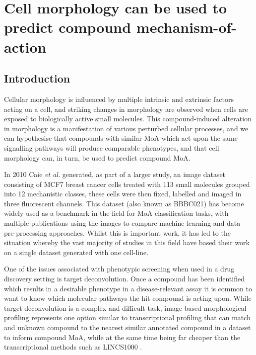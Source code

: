 \documentclass[a4paper,11pt,twoside,openright]{scrbook}
\begin{document}
\chapter{Cell morphology can be used to predict compound mechanism-of-action} \label{chapter:moa}

\section{Introduction}
Cellular morphology is influenced by multiple intrinsic and extrinsic factors acting on a cell, and striking changes in morphology are observed when cells are exposed to biologically active small molecules.
This compound-induced alteration in morphology is a manifestation of various perturbed cellular processes, and we can hypothesise that compounds with similar MoA which act upon the same signalling pathways will produce comparable phenotypes, and that cell morphology can, in turn, be used to predict compound MoA.

In 2010 Caie \textit{et al.} generated, as part of a larger study, an image dataset consisting of MCF7 breast cancer cells treated with 113 small molecules grouped into 12 mechanistic classes, these cells were then fixed, labelled and imaged in three fluorescent channels\cite{Caie2010}.
This dataset (also known as BBBC021) has become widely used as a benchmark in the field for MoA classification tasks, with multiple publications using the images to compare machine learning and data pre-processing approaches. \cite{Ljosa2013a,Singh2014a,Pawlowski2016,Ando2017}
Whilst this is important work, it has led to the situation whereby the vast majority of studies in this field have based their work on a single dataset generated with one cell-line.

One of the issues associated with phenotypic screening when used in a drug discovery setting is target deconvolution.
Once a compound has been identified which results in a desirable phenotype in a disease-relevant assay it is common to want to know which molecular pathways the hit compound is acting upon.
While target deconvolution is a complex and difficult task, image-based morphological profiling represents one option similar to transcriptional profiling that can match and unknown compound to the nearest similar annotated compound in a dataset to inform compound MoA, while at the same time being far cheaper than the transcriptional methods such as LINCS1000 \cite{Duan2014}.
\end{document}
